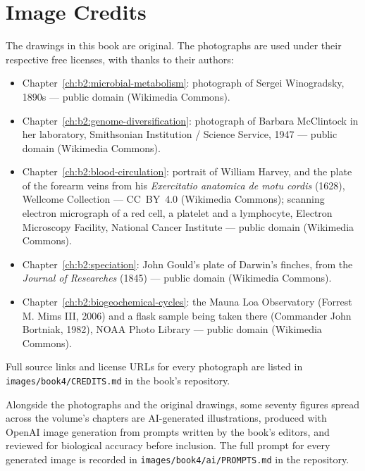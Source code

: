 \chapter*{Image Credits}

The drawings in this book are original. The photographs are used
under their respective free licenses, with thanks to their authors:

\begin{itemize}
  \item Chapter~\ref{ch:b2:microbial-metabolism}: photograph of Sergei
        Winogradsky, 1890s --- public domain (Wikimedia Commons).
  \item Chapter~\ref{ch:b2:genome-diversification}: photograph of
        Barbara McClintock in her laboratory, Smithsonian Institution /
        Science Service, 1947 --- public domain (Wikimedia Commons).
  \item Chapter~\ref{ch:b2:blood-circulation}: portrait of William
        Harvey, and the plate of the forearm veins from his
        \emph{Exercitatio anatomica de motu cordis} (1628), Wellcome
        Collection --- CC~BY~4.0 (Wikimedia Commons); scanning electron
        micrograph of a red cell, a platelet and a lymphocyte, Electron
        Microscopy Facility, National Cancer Institute --- public domain
        (Wikimedia Commons).
  \item Chapter~\ref{ch:b2:speciation}: John Gould's plate of Darwin's
        finches, from the \emph{Journal of Researches} (1845) --- public
        domain (Wikimedia Commons).
  \item Chapter~\ref{ch:b2:biogeochemical-cycles}: the Mauna Loa
        Observatory (Forrest M. Mims III, 2006) and a flask sample being
        taken there (Commander John Bortniak, 1982), NOAA Photo Library
        --- public domain (Wikimedia Commons).
\end{itemize}

Full source links and license URLs for every photograph are listed
in \texttt{images/book4/CREDITS.md} in the book's repository.

\bigskip
Alongside the photographs and the original drawings, some seventy
figures spread across the volume's chapters are AI-generated
illustrations, produced with OpenAI image generation from prompts
written by the book's editors, and reviewed for biological accuracy
before inclusion. The full prompt for every generated image is
recorded in \texttt{images/book4/ai/PROMPTS.md} in the repository.
\clearpage
